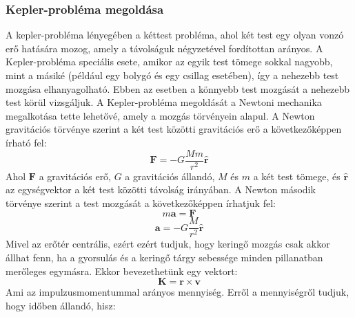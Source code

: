 \documentclass[../main.tex]{subfiles}
\begin{document}
\subsubsection{Kepler-probléma megoldása}
A kepler-probléma lényegében a kéttest probléma, ahol két test egy olyan vonzó erő hatására mozog, amely a távolságuk négyzetével fordítottan arányos. A Kepler-probléma speciális esete, amikor az egyik test tömege sokkal nagyobb, mint a másiké (például egy bolygó és egy csillag esetében),
így a nehezebb test mozgása elhanyagolható. Ebben az esetben a könnyebb test mozgását a nehezebb test körül vizsgáljuk. A Kepler-probléma megoldását a Newtoni mechanika megalkotása tette lehetővé, amely a mozgás törvényein alapul.
A Newton gravitációs törvénye szerint a két test közötti gravitációs erő a következőképpen írható fel:
\begin{equation}
    \mathbf{F} = -G \frac{M m}{r^2} \hat{\mathbf{r}}
\end{equation}
Ahol $\mathbf{F}$ a gravitációs erő, $G$ a gravitációs állandó, $M$ és $m$ a két test tömege, és $\hat{\mathbf{r}}$ az egységvektor a két test közötti távolság irányában. 
A Newton második törvénye szerint a test mozgását a következőképpen írhatjuk fel:
\begin{equation}
    m \mathbf{a} = \mathbf{F}
\end{equation}
\begin{equation}
    \mathbf{a} = -G \frac{M}{r^2} \hat{\mathbf{r}}
\end{equation}
Mivel az erőtér centrális, ezért ezért tudjuk, hogy keringő mozgás csak akkor állhat fenn, ha a gyorsulás és a keringő tárgy sebessége minden pillanatban merőleges egymásra. Ekkor bevezethetünk egy vektort:
\begin{equation}
    \mathbf{K} = \mathbf{r} \times \mathbf{v}
\end{equation}
Ami az impulzusmomentummal arányos mennyiség. Erről a mennyiségről tudjuk, hogy időben állandó, hisz:
\end{document}
